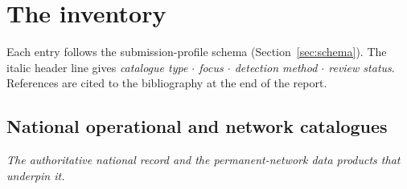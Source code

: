 \documentclass[10pt,a4paper]{article}
\begin{document}
\section{The inventory}\label{sec:inventory}
Each entry follows the submission-profile schema (Section~\ref{sec:schema}). The italic header line gives \emph{catalogue type $\cdot$ focus $\cdot$ detection method $\cdot$ review status}. References are cited to the bibliography at the end of the report.
\subsection{National operational and network catalogues}
\textit{The authoritative national record and the permanent-network data products that underpin it.}\par\vspace{4pt}
\end{document}
